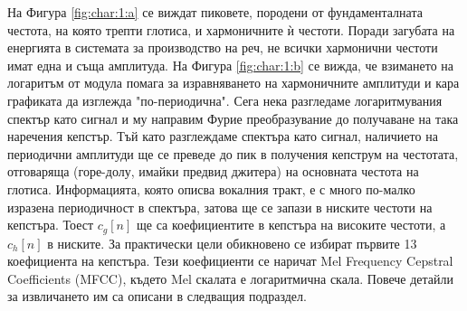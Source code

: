 \documentclass[main.tex]{subfiles}
\begin{document}
    На Фигура \autoref{fig:char:1:a} се виждат пиковете, породени от
    фундаменталната честота, на която трепти глотиса, и хармоничните ѝ честоти. Поради загубата на енергията в системата за производство на реч, не всички хармонични честоти имат една и съща амплитуда.
    На Фигура \autoref{fig:char:1:b} се вижда, че взимането на логаритъм от модула помага за изравняването на хармоничните амплитуди и кара графиката да изглежда "по-периодична". 
    Сега нека разгледаме логаритмувания спектър като сигнал и му направим Фурие преобразувание до получаване на така наречения кепстър.
    Тъй като разглеждаме спектъра като сигнал, наличието на периодични амплитуди ще се преведе до пик в получения кепструм на честотата, отговаряща (горе-долу, имайки предвид джитера) на основната честота на глотиса. Информацията, която описва вокалния тракт, е с много по-малко изразена периодичност в спектъра, затова ще се запази в ниските честоти на кепстъра. Тоест $c_g[n]$  ще са коефициентите в кепстъра на високите честоти, а $c_h[n]$ в ниските. За практически цели обикновено се избират първите 13 коефициента на кепстъра. Тези коефициенти се наричат Mel Frequency Cepstral Coefficients (MFCC), където Mel скалата е логаритмична скала. Повече детайли за извличането им са описани в следващия подраздел.
\end{document}
